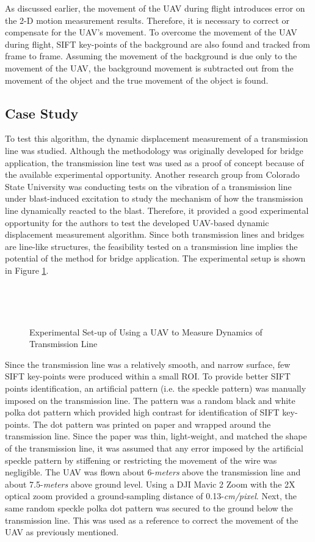 \documentclass{sigchi}
\begin{document}
As discussed earlier, the movement of the UAV during flight introduces error on the 2-D motion measurement results. Therefore, it is necessary to correct or compensate for the UAV's movement. To overcome the movement of the UAV during flight, SIFT key-points of the background are also found and tracked from frame to frame. Assuming the movement of the background is due only to the movement of the UAV, the background movement is subtracted out from the movement of the object and the true movement of the object is found. 

\subsection{Case Study}

To test this algorithm, the dynamic displacement measurement of a transmission line was studied. Although the methodology was originally developed for bridge application, the transmission line test was used as a proof of concept because of the available experimental opportunity. Another research group from Colorado State University was conducting tests on the vibration of a transmission line under blast-induced excitation to study the mechanism of how the transmission line dynamically reacted to the blast. Therefore, it provided a good experimental opportunity for the authors to test the developed UAV-based dynamic displacement measurement algorithm. Since both transmission lines and bridges are line-like structures, the feasibility tested on a transmission line implies the potential of the method for bridge application. The experimental setup is shown in Figure \ref{fig:blast}.

\begin{figure}[ht]
    \centering
    \\
    \caption{Experimental Set-up of Using a UAV to Measure Dynamics of Transmission Line}~\label{fig:blast}
\end{figure}

Since the transmission line was a relatively smooth, and narrow surface, few SIFT key-points were produced within a small ROI. To provide better SIFT points identification, an artificial pattern (i.e. the speckle pattern) was manually imposed on the transmission line. The pattern was a random black and white polka dot pattern which provided high contrast for identification of SIFT key-points. The dot pattern was printed on paper and wrapped around the transmission line. Since the paper was thin, light-weight, and matched the shape of the transmission line, it was assumed that any error imposed by the artificial speckle pattern by stiffening or restricting the movement of the wire was negligible. The UAV was flown about 6-\textit{meters} above the transmission line and about 7.5-\textit{meters} above ground level. Using a DJI Mavic 2 Zoom with the 2X optical zoom provided a ground-sampling distance of 0.13-\textit{cm/pixel}. Next, the same random speckle polka dot pattern was secured to the ground below the transmission line. This was used as a reference to correct the movement of the UAV as previously mentioned.
\end{document}
